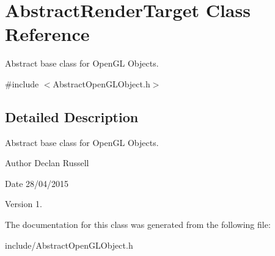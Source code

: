\hypertarget{class_abstract_render_target}{\section{Abstract\-Render\-Target Class Reference}
\label{class_abstract_render_target}
}


Abstract base class for Open\-G\-L Objects.  




{\ttfamily \#include $<$Abstract\-Open\-G\-L\-Object.\-h$>$}



\subsection{Detailed Description}
Abstract base class for Open\-G\-L Objects. 

\begin{DoxyAuthor}{Author}
Declan Russell 
\end{DoxyAuthor}
\begin{DoxyDate}{Date}
28/04/2015 
\end{DoxyDate}
\begin{DoxyVersion}{Version}
1. 
\end{DoxyVersion}


The documentation for this class was generated from the following file\-:\begin{DoxyCompactItemize}
\item 
include/Abstract\-Open\-G\-L\-Object.\-h\end{DoxyCompactItemize}
